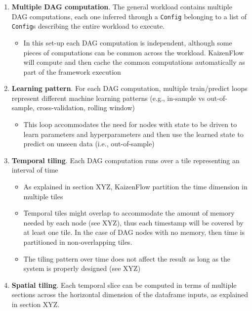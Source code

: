 \documentclass[11pt, reqno]{amsart}
\theoremstyle{definition}
\theoremstyle{remark}
\begin{document}
\begin{enumerate}
  \item \textbf{Multiple DAG computation}. The general workload contains multiple
        DAG computations, each one inferred through a \verb|Config| belonging to
        a list of \verb|Config|s describing the entire workload to execute.
        \begin{itemize}
          \item In this set-up each DAG computation is independent, although
                some pieces of computations can be common across the workload.
                KaizenFlow will compute and then cache the common computations
                automatically as part of the framework execution
        \end{itemize}

  \item \textbf{Learning pattern}. For each DAG computation, multiple train/predict loops represent
        different machine learning patterns (e.g., in-sample vs out-of-sample,
        cross-validation, rolling window)
        \begin{itemize}
          \item This loop accommodates the need for nodes with state to be
                driven to learn parameters and hyperparameters and then use the
                learned state to predict on unseen data (i.e., out-of-sample)
        \end{itemize}
  \item \textbf{Temporal tiling}. Each DAG computation runs over a tile
        representing an interval of time
        \begin{itemize}
          \item As explained in section XYZ, KaizenFlow partition the time
                dimension in multiple tiles
          \item Temporal tiles might overlap to accommodate the amount of
                memory needed by each node (see XYZ), thus each timestamp will be
                covered by at least one tile. In the case of DAG nodes with no
                memory, then time is partitioned in non-overlapping tiles.
          \item The tiling pattern over time does not affect the result as long
                as the system is properly designed (see XYZ)
        \end{itemize}
  \item \textbf{Spatial tiling}. Each temporal slice can be computed in terms
        of multiple sections across the horizontal dimension of the dataframe
        inputs, as explained in section XYZ.


\end{enumerate}
\end{document}
